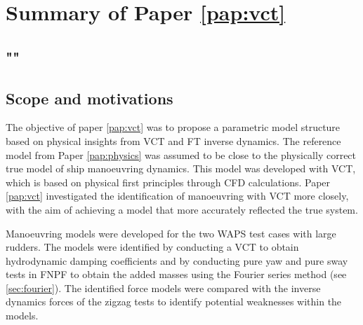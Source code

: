 \section{Summary of Paper \ref{pap:vct}}
\subsection*{""}
\subsection*{Scope and motivations}
The objective of paper \ref{pap:vct} was to propose a parametric model structure based on physical insights from VCT and FT inverse dynamics. The reference model from Paper \ref{pap:physics} was assumed to be close to the physically correct true model of ship manoeuvring dynamics. This model was developed with VCT, which is based on physical first principles through CFD calculations. Paper \ref{pap:vct} investigated the identification of manoeuvring with VCT more closely, with the aim of achieving a model that more accurately reflected the true system.

Manoeuvring models were developed for the two WAPS test cases with large rudders. The models were identified by conducting a VCT to obtain hydrodynamic damping coefficients and by conducting pure yaw and pure sway tests in FNPF to obtain the added masses using the Fourier series method (see \autoref{sec:fourier}). The identified force models were compared with the inverse dynamics forces of the zigzag tests to identify potential weaknesses within the models.

